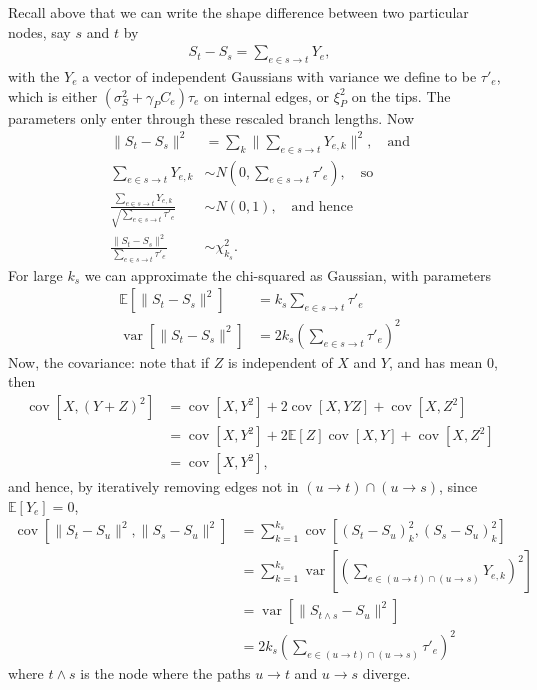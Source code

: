 \documentclass{article}
\newcommand{\E}{\mathbb{E}}
\DeclareMathOperator{\cov}{cov}
\DeclareMathOperator{\var}{var}
\begin{document}
Recall above that we can write the shape difference between two particular nodes, 
say $s$ and $t$ by
\begin{align*}
    S_t - S_s = \sum_{e \in s \to t} Y_e ,
\end{align*}
with the $Y_e$ a vector of independent Gaussians with variance we define to be $\tau'_e$, 
which is either $(\sigma^2_S + \gamma_P C_e) \tau_e$ on internal edges, or $\xi^2_P$ on the tips.
The parameters only enter through these rescaled branch lengths.
Now 
\begin{align}
  \|S_t - S_s\|^2 &= \sum_k \| \sum_{e \in s \to t} Y_{e,k} \|^2 , \quad \text{and} \\
  \sum_{e \in s \to t} Y_{e,k} & \sim N(0, \sum_{e \in s \to t} \tau'_e ), \quad \text{so} \\
  \frac{ \sum_{e \in s \to t} Y_{e,k} }{ \sqrt{ \sum_{e \in s \to t} \tau'_e } } &\sim N(0,1), \quad \text{and hence} \\
  \frac{ \|S_t - S_s\|^2 }{  \sum_{e \in s \to t} \tau'_e } &\sim \chi^2_{k_s} .
\end{align}
For large $k_s$ we can approximate the chi-squared as Gaussian,
with parameters
\begin{align*}
    \E[ \|S_t - S_s\|^2 ] &= k_s \sum_{e \in s \to t} \tau'_e \\
    \var[ \|S_t - S_s\|^2 ] &= 2 k_s \left( \sum_{e \in s \to t} \tau'_e \right)^2 
\end{align*}
Now, the covariance: note that if $Z$ is independent of $X$ and $Y$, and has mean 0, then
\begin{align}
    \cov[X,(Y+Z)^2] &= \cov[X,Y^2] + 2 \cov[X,YZ] + \cov[X, Z^2] \\
    &= \cov[X,Y^2] + 2 \E[Z] \cov[X,Y] + \cov[X,Z^2] \\
    &= \cov[X,Y^2] ,
\end{align}
and hence, by iteratively removing edges not in $(u \to t) \cap (u \to s)$,
since $\E[Y_e]=0$,
\begin{align}
    \cov[ \|S_t - S_u\|^2, \|S_s - S_u\|^2 ] &= \sum_{k=1}^{k_s} \cov\left[ (S_t-S_u)_k^2, (S_s-S_u)_k^2 \right] \\
          &= \sum_{k=1}^{k_s} \var\left[ \left( \sum_{e \in (u \to t) \cap (u \to s)} Y_{e,k} \right)^2 \right] \\
                                             &= \var\left[ \|S_{t \wedge s} - S_u\|^2 \right] \\
                                             &= 2 k_s \left( \sum_{e \in (u \to t) \cap (u \to s) } \tau'_e \right)^2 
\end{align}
where $t \wedge s$ is the node where the paths $u \to t$ and  $u \to s$ diverge.
\end{document}
